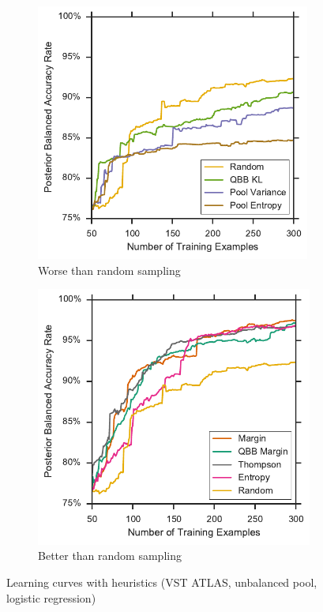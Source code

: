 \begin{figure}[p]
	\centering
	\begin{subfigure}{.5\textwidth}
		\centering
		\includegraphics[width=0.99\textwidth]{figures/5_active/vstatlas_ur_ind_lower}
		\caption{Worse than random sampling}
		\label{fig:vstatlas_ur_ind_lower}
	\end{subfigure}%
	\begin{subfigure}{.5\textwidth}
		\centering
		\includegraphics[width=0.99\linewidth]{figures/5_active/vstatlas_ur_ind_upper}
		\caption{Better than random sampling}
		\label{fig:vstatlas_ur_ind_upper}
	\end{subfigure}
	\caption[Learning curves with heuristics (VST ATLAS, unbalanced, logistic)]{
		Learning curves with heuristics (VST ATLAS, unbalanced pool, logistic regression)}
	\label{fig:vstatlas_ur_ind}
\end{figure}

